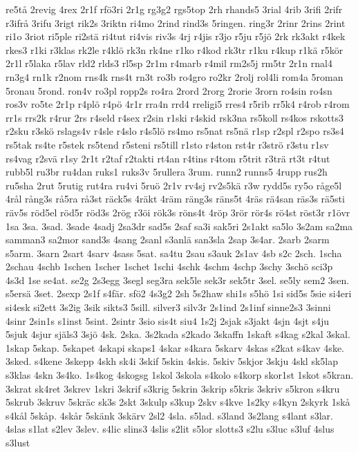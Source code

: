 {re5tå
2revig
4rex
2r1f
rfö3ri
2r1g
rg3g2
rgs5top
2rh
rhands5
3rial
4rib
3rifi
2rifr
r3ifrå
3rifu
3rigt
rik2s
3riktn
ri4mo
2rind
rind3s
5ringen.
ring3r
2rinr
2rins
2rint
ri1o
3riot
ri5ple
ri2stä
ri4tut
ri4vis
riv3s
4rj
r4jis
r3jo
r5ju
r5jö
2rk
rk3akt
r4kek
rkes3
r1ki
r3klas
rk2le
r4klö
rk3n
rk4ne
r1ko
r4kod
rk3tr
r1ku
r4kup
r1kä
r5kör
2r1l
r5laka
r5lav
rld2
rlds3
rl5sp
2r1m
r4marb
r4mil
rm2s5j
rm5tr
2r1n
rnal4
rn3g4
rn1k
r2nom
rns4k
rns4t
rn3t
ro3b
ro4gro
ro2kr
2rolj
rol4li
rom4a
5roman
5ronau
5rond.
ron4v
ro3pl
ropp2s
ro4ra
2rord
2rorg
2rorie
3rorn
ro4sin
ro4sn
ros3v
ro5te
2r1p
r4plö
r4pö
4r1r
rra4n
rrd4
rreligi5
rres4
r5rib
rr5k4
r4rob
r4rom
rr1s
rrs2k
r4rur
2rs
r4seld
r4sex
r2sin
r1ski
r4skid
rsk3na
rs5koll
rs4kos
rskotts3
r2sku
r3skö
rslags4v
r4sle
r4slo
r4s5lö
rs4mo
rs5nat
rs5nä
r1sp
r2spl
r2spo
rs3s4
rs5tak
rs4te
r5stek
rs5tend
r5steni
rs5till
r1sto
r4ston
rst4r
r3strö
r3stu
r1sv
rs4vag
r2svä
r1sy
2r1t
r2taf
r2takti
rt4an
r4tins
r4tom
r5trit
r3trä
rt3t
r4tut
rubb5l
ru3br
ru4dan
ruks1
ruks3v
5rullera
3rum.
runn2
runns5
4rupp
rus2h
ru5sha
2rut
5rutig
rut4ra
ru4vi
5ruö
2r1v
rv4sj
rv2s5kä
r3w
rydd5s
ry5o
råge5l
4rål
rång3s
rå5ra
rå3st
räck5s
4räkt
4räm
räng3s
räns5t
4räs
rä4san
räs3s
rä5sti
räv5s
röd5el
röd5r
röd3s
2rög
r3öi
rök3s
röns4t
4röp
3rör
rör4s
rö4st
röst3r
r1övr
1sa
3sa.
3sad.
3sade
4sadj
2sa3dr
sad5s
2saf
sa3i
sak5ri
2s1akt
sa5lo
3s2am
sa2ma
samman3
sa2mor
sand3s
4sang
2sanl
s3anlä
san3sla
2sap
3s4ar.
2sarb
2sarm
s5arm.
3sarn
2sart
4sarv
4sass
5sat.
sa4tu
2sau
s3auk
2s1av
4sb
s2c
2sch.
1scha
2schau
4schb
1schen
1scher
1schet
1schi
4schk
4schm
4schp
3schy
3schö
sci3p
4s3d
1se
se4at.
se2g
2s3egg
3segl
seg3ra
sek5le
sek3r
sek5tr
3sel.
se5ly
sem2
3sen.
s5ersä
3set.
2sexp
2s1f
s4fär.
sfö2
4s3g2
2sh
5s2haw
shi1s
s5hö
1si
sid5s
5sie
si4eri
si4esk
si2ett
3s2ig
3sik
sikts3
5sill.
silver3
silv3r
2s1ind
2s1inf
sinne2s3
3sinni
4sinr
2sin1s
s1inst
5sint.
2sintr
3sio
sis4t
siu4
1s2j
2sjak
s3jakt
4sjn
4sjt
s4ju
5sjuk
4sjur
själs3
3sjö
4sk.
2ska.
3s2kada
s2kado
3skaffn
1skaft
s4kag
s2kal
3skal.
1skap
5skap.
5skapet
4skapi
skaps1
4skar
s4kara
5skarv
4skas
s2kat
s4kav
4ske.
3sked.
s4kene
3skepp
4skh
sk4i
3skif
5skin
4skis.
5skiv
5skjor
3skju
4skl
sk5lap
s3klas
4skn
3s4ko.
1s4kog
4skogsg
1skol
3skola
s4kolo
s4korp
skor1st
1skot
s5kran.
3skrat
sk4ret
3skrev
1skri
3skrif
s3krig
5skrin
3skrip
s5kris
3skriv
s5kron
s4kru
5skrub
3skruv
5skräc
sk3s
2skt
3skulp
s3kup
2skv
s4kve
1s2ky
s4kyn
2skyrk
1skå
s4kål
5skåp.
4skår
5skänk
3skärv
2sl2
4sla.
s5lad.
s3land
3s2lang
s4lant
s3lar.
4slas
s1lat
s2lev
3slev.
s4lic
slins3
4slis
s2lit
s5lor
slotts3
s2lu
s3luc
s3luf
4slus
s3lust
}
